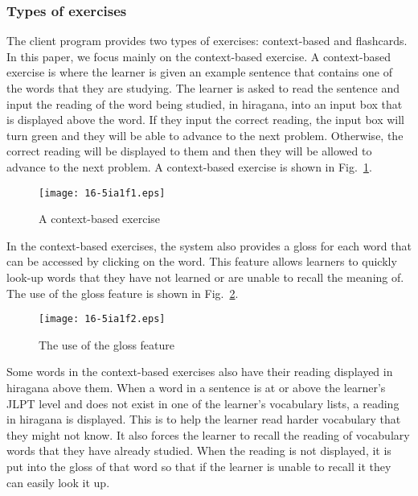 \documentclass[english]{jnlp_1.4}
\begin{document}
\subsubsection{Types of exercises}

The client program provides two types of exercises: context-based and flashcards. In this paper, we focus mainly on the context-based exercise. A context-based exercise is where the learner is given an example sentence that contains one of the words that they are studying. The learner is asked to read the sentence and input the reading of the word being studied, in hiragana, into an input box that is displayed above the word. If they input the correct reading, the input box will turn green and they will be able to advance to the next problem. Otherwise, the correct reading will be displayed to them and then they will be allowed to advance to the next problem. A context-based exercise is shown in Fig.~\ref{fig1}.

\begin{figure}[b]
\vspace{0.5\baselineskip}
\begin{center}
  \texttt{[image: 16-5ia1f1.eps]}
\end{center}
  \caption{A context-based exercise}
  \label{fig1}
\end{figure}

In the context-based exercises, the system also provides a gloss for each word that can be accessed by clicking on the word. This feature allows learners to quickly look-up words that they have not learned or are unable to recall the meaning of. The use of the gloss feature is shown in Fig.~\ref{fig2}.

\begin{figure}[t]
\begin{center}
  \texttt{[image: 16-5ia1f2.eps]}
\end{center}
  \caption{The use of the gloss feature}
  \label{fig2}
\vspace{-1\baselineskip}
\end{figure}

Some words in the context-based exercises also have their reading displayed in hiragana above them. When a word in a sentence is at or above the learner's JLPT level and does not exist in one of the learner's vocabulary lists, a reading in hiragana is displayed. This is to help the learner read harder vocabulary that they might not know. It also forces the learner to recall the reading of vocabulary words that they have already studied. When the reading is not displayed, it is put into the gloss of that word so that if the learner is unable to recall it they can easily look it up.
\end{document}

